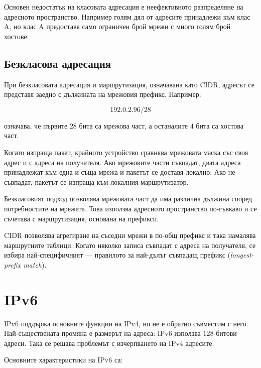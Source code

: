 Основен недостатък на класовата адресация е неефективното разпределяне на адресното пространство. Например голям дял от адресите принадлежи към клас A, но клас A предоставя само ограничен брой мрежи с много голям брой хостове.

\subsection{Безкласова адресация}\label{s:13.4.2}

При безкласовата адресация и маршрутизация, означавана като CIDR, адресът се представя заедно с дължината на мрежовия префикс. Например:

\[
192.0.2.96/28
\]

означава, че първите $28$ бита са мрежова част, а останалите $4$ бита са хостова част.

Когато изпраща пакет, крайното устройство сравнява мрежовата маска със своя адрес и с адреса на получателя. Ако мрежовите части съвпадат, двата адреса принадлежат към една и съща мрежа и пакетът се доставя локално. Ако не съвпадат, пакетът се изпраща към локалния маршрутизатор.

Безкласовият подход позволява мрежовата част да има различна дължина според потребностите на мрежата. Това използва адресното пространство по-гъвкаво и се съчетава с маршрутизация, основана на префикси.

CIDR позволява агрегиране на съседни мрежи в по-общ префикс и така намалява маршрутните таблици. Когато няколко записа съвпадат с адреса на получателя, се избира най-специфичният --- правилото за най-дълъг съвпадащ префикс (\emph{longest-prefix match}).

\section{IPv6}\label{s:13.5}

IPv6 поддържа основните функции на IPv4, но не е обратно съвместим с него. Най-съществената промяна е размерът на адреса: IPv6 използва $128$-битови адреси. Така се решава проблемът с изчерпването на IPv4 адресите.

Основните характеристики на IPv6 са:

